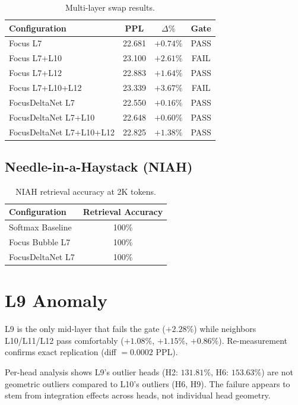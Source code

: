 \documentclass[11pt]{article}
\begin{document}
\begin{table}[h]
\centering
\caption{Multi-layer swap results.}
\label{tab:multilayer}
\begin{tabular}{lccc}
\toprule
Configuration & PPL & $\Delta\%$ & Gate \\
\midrule
Focus L7 & 22.681 & $+0.74\%$ & PASS \\
Focus L7+L10 & 23.100 & $+2.61\%$ & FAIL \\
Focus L7+L12 & 22.883 & $+1.64\%$ & PASS \\
Focus L7+L10+L12 & 23.339 & $+3.67\%$ & FAIL \\
\midrule
FocusDeltaNet L7 & 22.550 & $+0.16\%$ & PASS \\
FocusDeltaNet L7+L10 & 22.648 & $+0.60\%$ & PASS \\
FocusDeltaNet L7+L10+L12 & 22.825 & $+1.38\%$ & PASS \\
\bottomrule
\end{tabular}
\end{table}

\subsection{Needle-in-a-Haystack (NIAH)}

\begin{table}[h]
\centering
\caption{NIAH retrieval accuracy at 2K tokens.}
\begin{tabular}{lc}
\toprule
Configuration & Retrieval Accuracy \\
\midrule
Softmax Baseline & 100\% \\
Focus Bubble L7 & 100\% \\
FocusDeltaNet L7 & 100\% \\
\bottomrule
\end{tabular}
\end{table}

\section{L9 Anomaly}

L9 is the only mid-layer that fails the gate ($+2.28\%$) while neighbors L10/L11/L12 pass comfortably ($+1.08\%$, $+1.15\%$, $+0.86\%$). Re-measurement confirms exact replication (diff $= 0.0002$ PPL).

Per-head analysis shows L9's outlier heads (H2: $131.81\%$, H6: $153.63\%$) are not geometric outliers compared to L10's outliers (H6, H9). The failure appears to stem from integration effects across heads, not individual head geometry.
\end{document}
